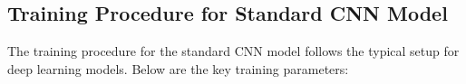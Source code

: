 \documentclass{article}
\begin{document}



\subsection{Training Procedure for Standard CNN Model}

The training procedure for the standard CNN model follows the typical setup for deep learning models. Below are the key training parameters:
\end{document}
